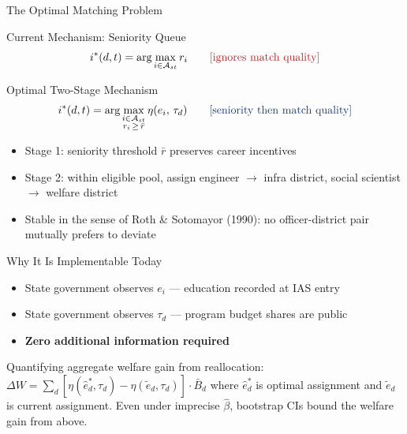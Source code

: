 \documentclass[aspectratio=169]{beamer}
\begin{document}
\begin{frame}{The Optimal Matching Problem}

\begin{block}{Current Mechanism: Seniority Queue}
\[
i^*(d,t) = \arg\max_{i \in \mathcal{A}_{st}} r_i
\qquad \textcolor{iasred}{\text{[ignores match quality]}}
\]
\end{block}

\bigskip

\begin{block}{Optimal Two-Stage Mechanism}
\[
i^*(d,t) = \arg\max_{\substack{i \in \mathcal{A}_{st} \\ r_i \,\geq\, \bar{r}}}
\eta(e_i,\, \tau_d)
\qquad \textcolor{iasblue}{\text{[seniority then match quality]}}
\]
\end{block}

\begin{itemize}\setlength\itemsep{4pt}
  \item Stage 1: seniority threshold $\bar{r}$ preserves career incentives
  \item Stage 2: within eligible pool, assign engineer $\to$ infra district,
        social scientist $\to$ welfare district
  \item Stable in the sense of Roth \& Sotomayor (1990):
        no officer-district pair mutually prefers to deviate
\end{itemize}

\bigskip

\begin{block}{Why It Is Implementable Today}
\begin{itemize}\setlength\itemsep{3pt}
  \item State government observes $e_i$ --- education recorded at IAS entry
  \item State government observes $\tau_d$ --- program budget shares are public
  \item \textbf{Zero additional information required}
\end{itemize}
\end{block}

\vspace{4pt}
{\footnotesize \color{iasgray}
Quantifying aggregate welfare gain from reallocation:
$\Delta W = \sum_d \left[\eta(\hat e^*_d, \tau_d) - \eta(\tilde e_d, \tau_d)\right] \cdot \bar B_d$
where $\hat e^*_d$ is optimal assignment and $\tilde e_d$ is current assignment.
Even under imprecise $\hat\beta$, bootstrap CIs bound the welfare gain from above.}

\end{frame}
\end{document}
